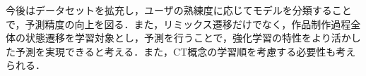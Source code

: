 \documentclass[submit,techrep,noauthor]{ipsj}
\begin{document}
今後はデータセットを拡充し，ユーザの熟練度に応じてモデルを分類することで，予測精度の向上を図る．また，リミックス遷移だけでなく，作品制作過程全体の状態遷移を学習対象とし，予測を行うことで，強化学習の特性をより活かした予測を実現できると考える．また，CT概念の学習順を考慮する必要性も考えられる．





\end{document}
